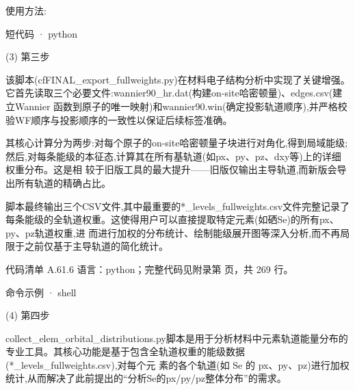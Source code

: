 \documentclass[lang=cn,scheme=chinese,color=blue,device=normal,toc=onecol,math=cm]{elegantbook}
\begin{document}
使用方法:\par


\begin{inlinecodebox}{短代码 · python}
\end{inlinecodebox}


(3) 第三步\par


该脚本(cfFINAL\_\allowbreak{}export\_\allowbreak{}fullweights.py)在材料电子结构分析中实现了关键增强。它首先读取三个必要文件:wannier90\_\allowbreak{}hr.dat(构建on-site哈密顿量)、edges.csv(建立Wannier 函数到原子的唯一映射)和wannier90.win(确定投影轨道顺序),并严格校验WF顺序与投影顺序的一致性以保证后续标签准确。\par


其核心计算分为两步:对每个原子的on-site哈密顿量子块进行对角化,得到局域能级;然后,对每条能级的本征态,计算其在所有基轨道(如px、py、pz、dxy等)上的详细权重分布。这是相 较于旧版工具的最大提升——旧版仅输出主导轨道,而新版会导出所有轨道的精确占比。\par


脚本最终输出三个CSV文件,其中最重要的*\_\allowbreak{}levels\_\allowbreak{}fullweights.csv文件完整记录了每条能级的全轨道权重。这使得用户可以直接提取特定元素(如硒Se)的所有px、py、pz轨道权重,进 而进行加权的分布统计、绘制能级展开图等深入分析,而不再局限于之前仅基于主导轨道的简化统计。\par


\begin{codeindexbox}{代码清单 A.61.6}
语言：python；完整代码见附录第 \pageref{code:61:6} 页，共 269 行。
\end{codeindexbox}


\begin{inlinecodebox}{命令示例 · shell}
\end{inlinecodebox}


(4) 第四步\par


collect\_\allowbreak{}elem\_\allowbreak{}orbital\_\allowbreak{}distributions.py脚本是用于分析材料中元素轨道能量分布的专业工具。其核心功能是基于包含全轨道权重的能级数据(*\_\allowbreak{}levels\_\allowbreak{}fullweights.csv),对每个元 素的各个轨道(如 Se 的 px、py、pz)进行加权统计,从而解决了此前提出的“分析Se的px/\allowbreak{}py/\allowbreak{}pz整体分布”的需求。\par
\end{document}
